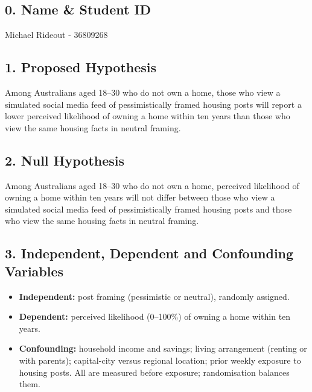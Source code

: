 \documentclass[
]{article}
\author{}
\date{}
\providecommand{\tightlist}{%
  \setlength{\itemsep}{0pt}\setlength{\parskip}{0pt}}
\begin{document}
\hypertarget{name-student-id}{%
\subsection{0. Name \& Student ID}\label{name-student-id}}

Michael Rideout - 36809268

\hypertarget{proposed-hypothesis}{%
\subsection{1. Proposed Hypothesis}\label{proposed-hypothesis}}

Among Australians aged 18--30 who do not own a home, those who view a
simulated social media feed of pessimistically framed housing posts will
report a lower perceived likelihood of owning a home within ten years
than those who view the same housing facts in neutral framing.

\hypertarget{null-hypothesis}{%
\subsection{2. Null Hypothesis}\label{null-hypothesis}}

Among Australians aged 18--30 who do not own a home, perceived
likelihood of owning a home within ten years will not differ between
those who view a simulated social media feed of pessimistically framed
housing posts and those who view the same housing facts in neutral
framing.

\hypertarget{independent-dependent-and-confounding-variables}{%
\subsection{3. Independent, Dependent and Confounding
Variables}\label{independent-dependent-and-confounding-variables}}

\begin{itemize}
\tightlist
\item
  \textbf{Independent:} post framing (pessimistic or neutral), randomly
  assigned.
\item
  \textbf{Dependent:} perceived likelihood (0--100\%) of owning a home
  within ten years.
\item
  \textbf{Confounding:} household income and savings; living arrangement
  (renting or with parents); capital-city versus regional location;
  prior weekly exposure to housing posts. All are measured before
  exposure; randomisation balances them.
\end{itemize}
\end{document}
